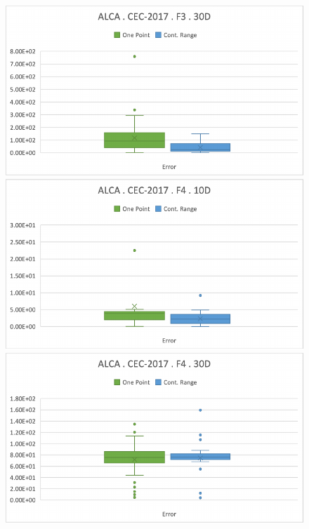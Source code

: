 \documentclass[graybox]{svmult}
\begin{document}
\begin{figure}[!ht]
\begin{minipage}[h]{0.49\linewidth}
        \end{minipage}
        \hfill
        \begin{minipage}[h]{0.49\linewidth}
            \includegraphics[width=1\linewidth]{img/fig_experiment_F3x30D.pdf} 
        \end{minipage}
        \vfill
        \vspace{0.05 cm}
        \begin{minipage}[h]{0.49\linewidth}
            \includegraphics[width=1\linewidth]{img/fig_experiment_F4x10D.pdf} 
        \end{minipage}
        \hfill
        \begin{minipage}[h]{0.49\linewidth}
            \includegraphics[width=1\linewidth]{img/fig_experiment_F4x30D.pdf} 

\end{minipage}
\end{figure}
\end{document}
